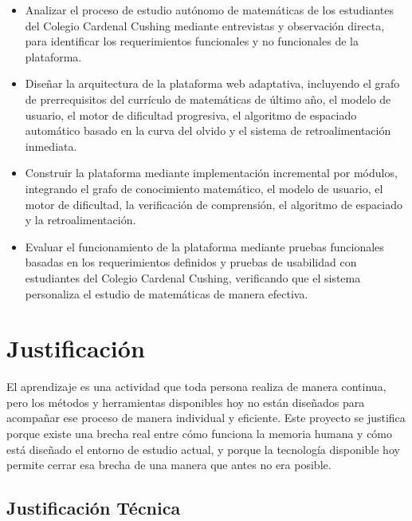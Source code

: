 \documentclass{univalle-perfil}
\begin{document}
\begin{itemize}
    \item Analizar el proceso de estudio autónomo de matemáticas de los estudiantes del Colegio Cardenal Cushing mediante entrevistas y observación directa, para identificar los requerimientos funcionales y no funcionales de la plataforma.
    \item Diseñar la arquitectura de la plataforma web adaptativa, incluyendo el grafo de prerrequisitos del currículo de matemáticas de último año, el modelo de usuario, el motor de dificultad progresiva, el algoritmo de espaciado automático basado en la curva del olvido y el sistema de retroalimentación inmediata.
    \item Construir la plataforma mediante implementación incremental por módulos, integrando el grafo de conocimiento matemático, el modelo de usuario, el motor de dificultad, la verificación de comprensión, el algoritmo de espaciado y la retroalimentación.
    \item Evaluar el funcionamiento de la plataforma mediante pruebas funcionales basadas en los requerimientos definidos y pruebas de usabilidad con estudiantes del Colegio Cardenal Cushing, verificando que el sistema personaliza el estudio de matemáticas de manera efectiva.
\end{itemize}

\section{Justificación}

El aprendizaje es una actividad que toda persona realiza de manera continua, pero los métodos y herramientas disponibles hoy no están diseñados para acompañar ese proceso de manera individual y eficiente. Este proyecto se justifica porque existe una brecha real entre cómo funciona la memoria humana y cómo está diseñado el entorno de estudio actual, y porque la tecnología disponible hoy permite cerrar esa brecha de una manera que antes no era posible.

\subsection{Justificación Técnica}
\end{document}
